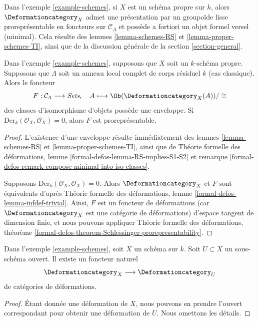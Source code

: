 \noindent
Dans l'exemple \ref{example-schemes}, si $X$ est un schéma propre sur $k$,
alors $\Deformationcategory_X$
admet une présentation par un groupoïde lisse proreprésentable en foncteurs
sur $\mathcal{C}_\Lambda$
et possède a fortiori un objet formel versel (minimal). Cela résulte
des lemmes \ref{lemma-schemes-RS} et
\ref{lemma-proper-schemes-TI},
ainsi que de la discussion générale de la section \ref{section-general}.

\begin{lemma}
\label{lemma-schemes-hull}
Dans l'exemple \ref{example-schemes}, supposons que $X$ soit un $k$-schéma propre.
Supposons que $\Lambda$ soit un anneau local complet de corps résiduel $k$
(cas classique). Alors le foncteur
$$
F : \mathcal{C}_\Lambda \longrightarrow \textit{Sets},\quad
A \longmapsto \Ob(\Deformationcategory_X(A))/\cong
$$
des classes d'isomorphisme d'objets possède une enveloppe. Si
$\text{Der}_k(\mathcal{O}_X, \mathcal{O}_X) = 0$, alors
$F$ est proreprésentable.
\end{lemma}

\begin{proof}
L'existence d'une enveloppe résulte immédiatement des
lemmes \ref{lemma-schemes-RS} et \ref{lemma-proper-schemes-TI}, ainsi que de
Théorie formelle des déformations, lemme \ref{formal-defos-lemma-RS-implies-S1-S2}
et remarque \ref{formal-defos-remark-compose-minimal-into-iso-classes}.

\medskip\noindent
Supposons $\text{Der}_k(\mathcal{O}_X, \mathcal{O}_X) = 0$. Alors
$\Deformationcategory_X$ et $F$ sont équivalents d'après
Théorie formelle des déformations, lemme \ref{formal-defos-lemma-infdef-trivial}.
Ainsi, $F$ est un foncteur de déformations (car $\Deformationcategory_X$ est une
catégorie de déformations) d'espace tangent de dimension finie, et nous pouvons appliquer
Théorie formelle des déformations, théorème
\ref{formal-defos-theorem-Schlessinger-prorepresentability}.
\end{proof}

\begin{lemma}
\label{lemma-open}
Dans l'exemple \ref{example-schemes}, soit $X$ un schéma sur $k$.
Soit $U \subset X$ un sous-schéma ouvert.
Il existe un foncteur naturel
$$
\Deformationcategory_X \longrightarrow \Deformationcategory_U
$$
de catégories de déformations.
\end{lemma}

\begin{proof}
Étant donnée une déformation de $X$, nous pouvons en prendre l'ouvert correspondant
pour obtenir une déformation de $U$. Nous omettons les détails.
\end{proof}

